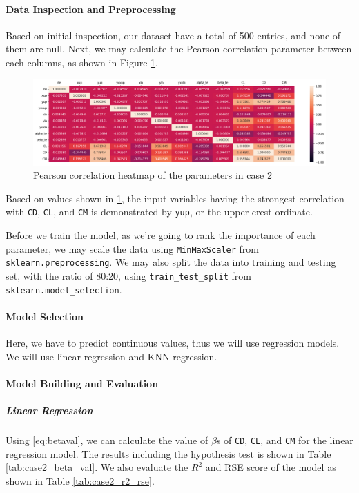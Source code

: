 \documentclass[conf]{new-aiaa}
\begin{document}
\paragraph{Data Inspection and Preprocessing}
Based on initial inspection, our dataset have a total of 500 entries, and none of them are null. Next, we may calculate the Pearson correlation parameter between each columns, as shown in Figure \ref{fig:case2_corr_heatmap}.
\begin{figure}[H]
    \centering
    \includegraphics[width=1.0\textwidth]{graph/case2_corr_heatmap.png}
    \caption{\label{fig:case2_corr_heatmap} Pearson correlation heatmap of the parameters in case 2}
\end{figure}
Based on values shown in \ref{fig:case2_corr_heatmap}, the input variables having the strongest correlation with \texttt{CD}, \texttt{CL}, and \texttt{CM} is demonstrated by \texttt{yup}, or the upper crest ordinate.

Before we train the model, as we're going to rank the importance of each parameter, we may scale the data using \texttt{MinMaxScaler} from \texttt{sklearn.preprocessing}. We may also split the data into training and testing set, with the ratio of 80:20, using \texttt{train\_test\_split} from \texttt{sklearn.model\_selection}.

\paragraph{Model Selection}
Here, we have to predict continuous values, thus we will use regression models. We will use linear regression and KNN regression. 

\paragraph{Model Building and Evaluation}
\subparagraph{Linear Regression}
Using \eqref{eq:betaval}, we can calculate the value of $\beta$s of \texttt{CD}, \texttt{CL}, and \texttt{CM} for the linear regression model. The results including the hypothesis test is shown in Table \ref{tab:case2_beta_val}. We also evaluate the $R^2$ and RSE score of the model as shown in Table \ref{tab:case2_r2_rse}.
\end{document}
